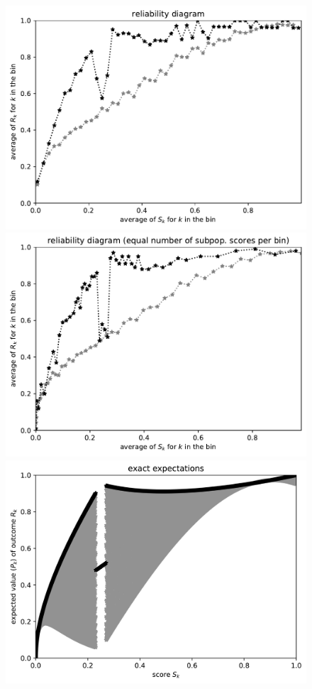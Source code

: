 \documentclass{article}
\begin{document}
\begin{figure}
\begin{centering}
\parbox{\imsize}{\includegraphics[width=\imsize]
                 {./codes/unweighted/50000_5000_50_0/equiscore.pdf}}
\quad\quad
\parbox{\imsize}{\includegraphics[width=\imsize]
                 {./codes/unweighted/50000_5000_50_0/equisamps.pdf}}

\vspace{\vertsep}

\parbox{\imsize}{\includegraphics[width=\imsize]
                 {./codes/unweighted/50000_5000_10_0/exact.jpg}}


\end{centering}
\end{figure}
\end{document}
